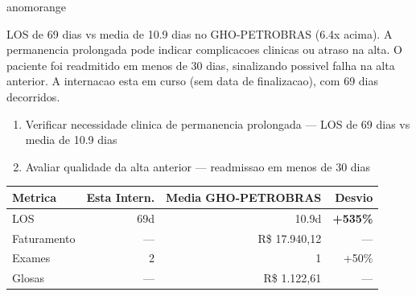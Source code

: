 \documentclass[a4paper,10pt]{article}
\begin{document}
\begin{anomalycard}[Internacao 161907 | GHO-PETROBRAS | ALTO (z=4.70)]{anomorange}
\vspace{2pt}\begin{tcolorbox}[colback=severityred!20,colframe=anomorange,title={\textbf{Interpretacao de Negocio}},fonttitle=\bfseries\small,left=4pt,right=4pt,top=3pt,bottom=3pt]
{\small LOS de 69 dias vs media de 10.9 dias no GHO-PETROBRAS (6.4x acima). A permanencia prolongada pode indicar complicacoes clinicas ou atraso na alta. O paciente foi readmitido em menos de 30 dias, sinalizando possivel falha na alta anterior. A internacao esta em curso (sem data de finalizacao), com 69 dias decorridos.}
\end{tcolorbox}
\begin{tcolorbox}[colback=severityyellow!30,colframe=anomorange,title={\textbf{Recomendacoes Especificas}},fonttitle=\bfseries\small,left=4pt,right=4pt,top=3pt,bottom=3pt]
\begin{enumerate}[nosep,leftmargin=16pt]
\item {\small Verificar necessidade clinica de permanencia prolongada --- LOS de 69 dias vs media de 10.9 dias}
\item {\small Avaliar qualidade da alta anterior --- readmissao em menos de 30 dias}
\end{enumerate}
\end{tcolorbox}
\begin{center}\begin{tabular}{l r r r}\toprule\textbf{Metrica} & \textbf{Esta Intern.} & \textbf{Media GHO-PETROBRAS} & \textbf{Desvio} \\\midrule
LOS & 69d & 10.9d & \textcolor{anomred}{\textbf{+535\%}} \\
Faturamento & --- & R\$ 17.940,12 & --- \\
Exames & 2 & 1 & \textcolor{anomorange}{+50\%} \\
Glosas & --- & R\$ 1.122,61 & --- \\
\bottomrule\end{tabular}\end{center}


\end{anomalycard}
\end{document}
